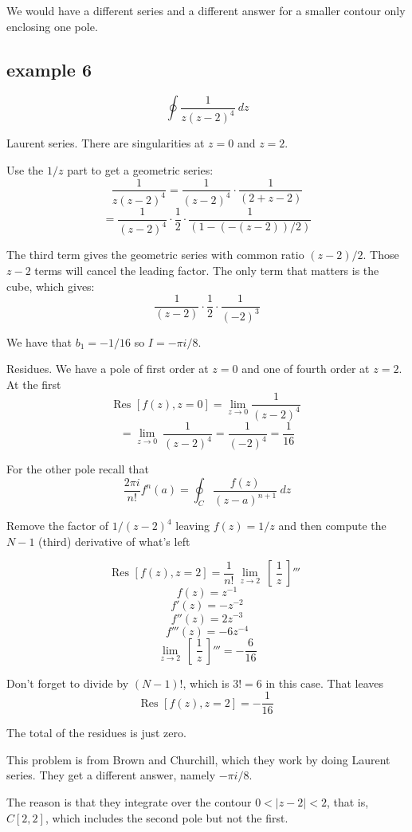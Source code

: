 \documentclass[11pt, oneside]{article}
\begin{document}
We would have a different series and a different answer for a smaller contour only enclosing one pole.

\subsection*{example 6}
\[ \oint \frac{1}{z(z - 2)^4} \ dz \]

Laurent series.  There are singularities at $z = 0$ and $z = 2$.

Use the $1/z$ part to get a geometric series:
\[ \frac{1}{z(z-2)^4} = \frac{1}{(z-2)^4} \cdot \frac{1}{(2 + z - 2)} \]
\[ = \frac{1}{(z-2)^4} \cdot \frac{1}{2} \cdot \frac{1}{(1 - (-(z-2))/2 )} \]

The third term gives the geometric series with common ratio $(z-2)/2$.  Those $z-2$ terms will cancel the leading factor.  The only term that matters is the cube, which gives:
\[  \frac{1}{(z-2)} \cdot \frac{1}{2} \cdot \frac{1}{(-2)^3} \]

We have that $b_1 = -1/16$ so $I = -\pi i/8$.

Residues.  We have a pole of first order at $z=0$ and one of fourth order at $z=2$.  At the first
\[ \text{Res } [f(z),z=0] = \lim_{z \rightarrow 0}   \frac{1}{(z-2)^4} \]
\[ =  \lim_{z \rightarrow 0} \ \frac{1}{(z-2)^4}  = \frac{1}{(-2)^4} =  \frac{1}{16} \]

For the other pole recall that
\[ \frac{2 \pi i}{n!} f^n(a) = \oint_C \frac{f(z)}{(z-a)^{n+1}} \ dz \]

Remove the factor of $1/(z-2)^4$ leaving $f(z) = 1/z$ and then compute the $N-1$ (third) derivative of what's left

\[ \text{Res } [f(z),z=2] = \frac{1}{n!} \ \lim_{z \rightarrow 2} \ [ \ \frac{1}{z} \ ]''' \ \]
\[ f(z) = z^{-1} \]
\[ f'(z) = - z^{-2} \]
\[ f''(z) = 2 z^{-3} \]
\[ f'''(z) = -6 z^{-4} \]
\[  \lim_{z \rightarrow 2} \ [ \ \frac{1}{z} \ ]''' = - \frac{6}{16} \]

Don't forget to divide by $(N-1)!$, which is $3! = 6$ in this case.  That leaves
\[ \text{Res } [f(z),z=2] = - \frac{1}{16} \]

The total of the residues is just zero.  

This problem is from Brown and Churchill, which they work by doing Laurent series.  They get a different answer, namely $-\pi i/8$.  

The reason is that they integrate over the contour $0 < | z - 2 | < 2$, that is, $C[2,2]$, which includes the second pole but not the first.  
\end{document}
